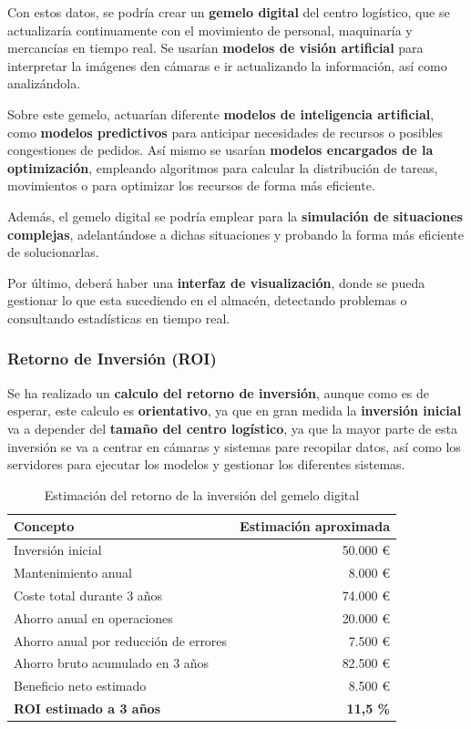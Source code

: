 Con estos datos, se podría crear un \textbf{gemelo digital} del centro logístico, que se actualizaría continuamente con el movimiento de personal, maquinaría y mercancías en tiempo real. Se usarían \textbf{modelos de visión artificial} para interpretar la imágenes den cámaras e ir actualizando la información, así como analizándola.

Sobre este gemelo, actuarían diferente \textbf{modelos de inteligencia artificial}, como \textbf{modelos predictivos} para anticipar necesidades de recursos o posibles congestiones de pedidos. Así mismo se usarían \textbf{modelos encargados de la optimización}, empleando algoritmos para calcular la distribución de tareas, movimientos o para optimizar los recursos de forma más eficiente.

Además, el gemelo digital se podría emplear para la \textbf{simulación de situaciones complejas}, adelantándose a dichas situaciones y probando la forma más eficiente de solucionarlas.


Por último, deberá haber una \textbf{interfaz de visualización}, donde se pueda gestionar lo que esta sucediendo en el almacén, detectando problemas o consultando estadísticas en tiempo real.

\subsubsection{Retorno de Inversión (ROI)}
Se ha realizado un \textbf{calculo del retorno de inversión}, aunque como es de esperar, este calculo es \textbf{orientativo}, ya que en gran medida la \textbf{inversión inicial} va a depender del \textbf{tamaño del centro logístico}, ya que la mayor parte de esta inversión se va a centrar en cámaras y sistemas pare recopilar datos, así como los servidores para ejecutar los modelos y gestionar los diferentes sistemas.


\begin{table}[ht]
	\centering
	\renewcommand{\arraystretch}{1.4} 
	\setlength{\tabcolsep}{10pt}     
	\begin{tabular}{|l|r|}
		\hline
		\textbf{Concepto} & \textbf{Estimación aproximada} \\ \hline
		Inversión inicial & 50.000 € \\ \hline
		Mantenimiento anual & 8.000 € \\ \hline
		Coste total durante 3 años & 74.000 € \\ \hline
		Ahorro anual en operaciones & 20.000 € \\ \hline
		Ahorro anual por reducción de errores & 7.500 € \\ \hline
		Ahorro bruto acumulado en 3 años & 82.500 € \\ \hline
		Beneficio neto estimado & 8.500 € \\ \hline
		\textbf{ROI estimado a 3 años} & \textbf{11,5 \%} \\ \hline
	\end{tabular}
	\caption{Estimación del retorno de la inversión del gemelo digital}
\end{table}

